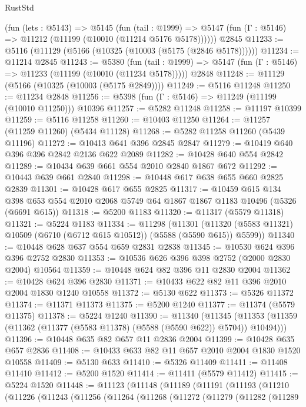 \begin{lexlean}{RustStd}
\begin{coremodule}
{\begin{coremodule}
{{{{{{{{{{{{{{{{{{{{{{{{{{{{{{{    (fun (lets : @5143) =>
    @5145
      (fun (tail : @1999) =>
      @5147 (fun (Γ : @5146) => @11212 (@11199 (@10010 (@11214 @5176 @5178))))))
    @2845
@11233 := @5116 (@11129 (@5166 (@10325 (@10003 (@5175 (@2846 @5178))))))
@11234 := @11214 @2845
@11243 := @5380
    (fun (tail : @1999) => @5147 (fun (Γ : @5146) => @11233 (@11199 (@10010 (@11234 @5178)))))
    @2848
@11248 := @11129 (@5166 (@10325 (@10003 (@5175 @2849))))
@11249 := @5116 @11248
@11250 := @11234 @2848
@11256 := @5398 (fun (Γ : @5146) => @11249 (@11199 (@10010 @11250))) @10396
@11257 := @5282 @11248
@11258 := @11197 @10399
@11259 := @5116 @11258
@11260 := @10403 @11250
@11264 := @11257 (@11259 @11260) (@5434 @11128)
@11268 := @5282 @11258 @11260 (@5439 @11196)
@11272 := @10413 @641 @396 @2845 @2847
@11279 := @10419 @640 @396 @396 @2842 @2136 @622 @2089
@11282 := @10428 @640 @554 @2842
@11289 := @10434 @639 @661 @554 @2010 @2840 @1867 @672
@11292 := @10443 @639 @661 @2840
@11298 := @10448 @617 @638 @655 @660 @2825 @2839
@11301 := @10428 @617 @655 @2825
@11317 := @10459
    @615
    @134
    @398
    @653
    @554
    @2010
    @2068
    @5749
    @64
    @1867
    @1867
    @1183
    @10496
    (@5326 (@6691 @615))
@11318 := @5200 @1183
@11320 := @11317 (@5579 @11318)
@11321 := @5224 @1183
@11334 := @11298
    (@11301 (@11320 (@5583 @11321) @10509 (@6710 (@6712 @615 @10512)) (@5588 (@5590 @615)) @5599))
@11340 := @10448 @628 @637 @554 @659 @2831 @2838
@11345 := @10530 @624 @396 @396 @2752 @2830
@11353 := @10536 @626 @396 @398 @2752 (@2000 @2830 @2004) @10564
@11359 := @10448 @624 @82 @396 @11 @2830 @2004
@11362 := @10428 @624 @396 @2830
@11371 := @10433 @622 @82 @11 @396 @2010 @2004 @1830 @1240 @10558
@11372 := @5130 @622
@11373 := @5326 @11372
@11374 := @11371 @11373
@11375 := @5200 @1240
@11377 := @11374 (@5579 @11375)
@11378 := @5224 @1240
@11390 := @11340
    (@11345 (@11353 (@11359 (@11362 (@11377 (@5583 @11378) (@5588 (@5590 @622)) @5704)) @10494)))
@11396 := @10448 @635 @82 @657 @11 @2836 @2004
@11399 := @10428 @635 @657 @2836
@11408 := @10433 @633 @82 @11 @657 @2010 @2004 @1830 @1520 @10558
@11409 := @5130 @633
@11410 := @5326 @11409
@11411 := @11408 @11410
@11412 := @5200 @1520
@11414 := @11411 (@5579 @11412)
@11415 := @5224 @1520
@11448 := @11123
    (@11148
      (@11189
        (@11191
          (@11193
            (@11210
              (@11226
                (@11243
                  (@11256
                    (@11264
                      (@11268
                        (@11272
                          (@11279
                            (@11282
                              (@11289
}}}}}}}}}}}}}}}}}}}}}}}}}}}}}}}
\end{coremodule}}
\end{coremodule}
\end{lexlean}
